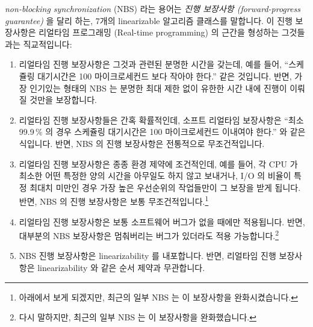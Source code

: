 \emph{non-blocking synchronization} (NBS) 라는 용어는
\emph{진행 보장사항 (forward-progress guarantee)} 을 달리 하는, 7개의
linearizable 알고리즘 클래스를 말합니다.
이 진행 보장사항은 리얼타임 프로그래밍 (Real-time programming) 의 근간을
형성하는 그것들과는 직교적입니다:
\iffalse

The term \emph{non-blocking synchronization} (NBS) describes seven classes of
linearizable algorithms with differing \emph{forward-progress guarantees}.
These forward-progress guarantees are orthogonal to those that form the
basis of real-time programming:
\fi

\begin{enumerate}
\item	리얼타임 진행 보장사항은 그것과 관련된 분명한 시간을 갖는데, 예를 들어,
	``스케쥴링 대기시간은 100 마이크로세컨드 보다 작아야 한다.'' 같은
	것입니다.
	반면, 가장 인기있는 형태의 NBS 는 분명한 최대 제한 없이 유한한 시간
	내에 진행이 이뤄질 것만을 보장합니다.
\item	리얼타임 진행 보장사항들은 간혹 확률적인데, 소프트 리얼타임 보장사항은
	``최소 99.9\,\% 의 경우 스케쥴링 대기시간은 100 마이크로세컨드 이내여야
	한다.'' 와 같은 식입니다.
	반면, NBS 의 진행 보장사항은 전통적으로 무조건적입니다.
\item	리얼타임 진행 보장사항은 종종 환경 제약에 조건적인데, 예를 들어, 각 CPU
	가 최소한 어떤 특정한 양의 시간을 아무일도 하지 않고 보내거나, I/O 의
	비율이 특정 최대치 미만인 경우 가장 높은 우선순위의 작업들만이 그
	보장을 받게 됩니다.
	반면, NBS 의 진행 보장사항은 보통 무조건적입니다.\footnote{
		아래에서 보게 되겠지만, 최근의 일부 NBS 는 이 보장사항을
		완화시켰습니다.}
\item	리얼타임 진행 보장사항은 보통 소프트웨어 버그가 없을 때에만 적용됩니다.
	반면, 대부분의 NBS 보장사항은 멈춰버리는 버그가 있더라도 적용
	가능합니다.\footnote{
		다시 말하지만, 최근의 일부 NBS 는 이 보장사항을 완화했습니다.}
\item	NBS 진행 보장사항은 linearizability 를 내포합니다.
	반면, 리얼타임 진행 보장사항은 linearizability 와 같은 순서 제약과
	무관합니다.
\end{enumerate}
\iffalse

